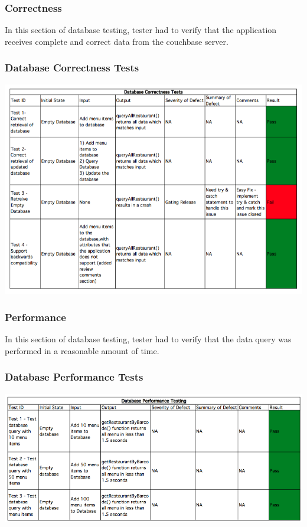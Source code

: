 \documentclass[12pt, titlepage]{article}
\begin{document}
\subsubsection{Correctness}
In this section of database testing, tester had to verify that the application receives complete and correct data from the couchbase server.
\subsubsection{Database Correctness Tests }
\includegraphics[width=\textwidth,height=\textheight,keepaspectratio]{correctness_tests.png}

\subsubsection{Performance}
In this section of database testing, tester had to verify that the data query was performed in a reasonable amount of time. 
\subsubsection{Database Performance Tests }
\includegraphics[width=\textwidth,height=\textheight,keepaspectratio]{performance_tests.png}
\end{document}
